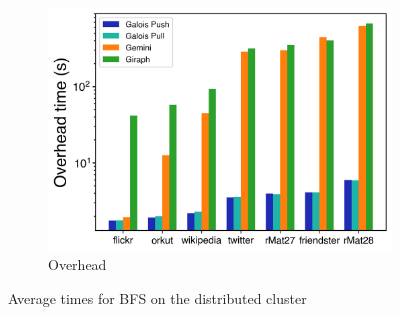 \documentclass{meetings}
\begin{document}
\begin{figure}
\begin{subfigure}{0.32\textwidth}
		\includegraphics[width=\linewidth]{../../plots/distributedBFS_overheadTime.png}
		\caption{Overhead}
		\label{fig:distributedBFS_overhead}
	\end{subfigure}
	\hfil
	\caption{Average times for BFS on the distributed cluster}
	\label{fig:distributedBFS}
\end{figure}

\clearpage
\end{document}
